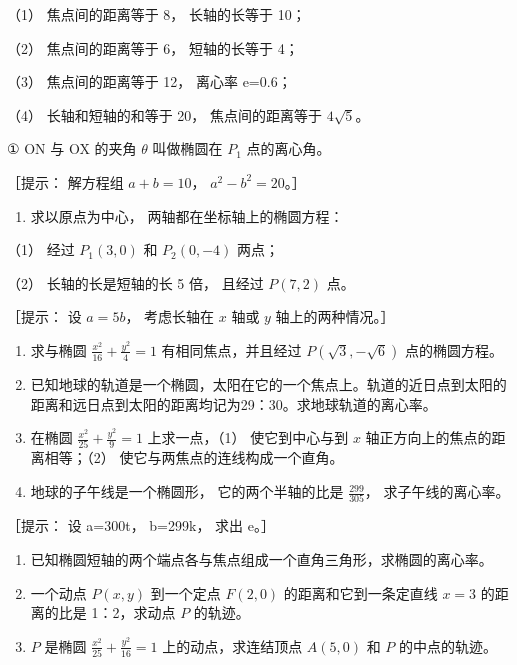（1） 焦点间的距离等于 8， 长轴的长等于 10；

（2） 焦点间的距离等于 6， 短轴的长等于 4；

（3） 焦点间的距离等于 12， 离心率 e=0.6；

（4） 长轴和短轴的和等于 20， 焦点间的距离等于 \(4 \sqrt{5}\)。

① ON 与 OX 的夹角 \(\theta\) 叫做椭圆在 \(P_{1}\) 点的离心角。

［提示： 解方程组 \(a+b=10\)， \(a^{2}-b^{2}=20\)。］

\begin{enumerate}
\def\labelenumi{\arabic{enumi}.}
\setcounter{enumi}{1}
\tightlist
\item
  求以原点为中心， 两轴都在坐标轴上的椭圆方程：
\end{enumerate}

（1） 经过 \(P_{1}(3,0)\) 和 \(P_{2}(0,-4)\) 两点；

（2） 长轴的长是短轴的长 5 倍， 且经过 \(P(7, 2)\) 点。

［提示： 设 \(a = 5b\)， 考虑长轴在 \(x\) 轴或 \(y\) 轴上的两种情况。］

\begin{enumerate}
\def\labelenumi{\arabic{enumi}.}
\setcounter{enumi}{2}
\item
  求与椭圆 \(\frac{x^2}{16} + \frac{y^2}{4} = 1\) 有相同焦点，并且经过
  \(P(\sqrt{3}, -\sqrt{6})\) 点的椭圆方程。
\item
  已知地球的轨道是一个椭圆，太阳在它的一个焦点上。轨道的近日点到太阳的距离和远日点到太阳的距离均记为29：30。求地球轨道的离心率。
\item
  在椭圆 \(\frac{x^2}{25} + \frac{y^2}{9} = 1\) 上求一点，（1）
  使它到中心与到 \(x\) 轴正方向上的焦点的距离相等；（2）
  使它与两焦点的连线构成一个直角。
\item
  地球的子午线是一个椭圆形， 它的两个半轴的比是 \(\frac{299}{305}\)，
  求子午线的离心率。
\end{enumerate}

［提示： 设 a=300t， b=299k， 求出 e。］

\begin{enumerate}
\def\labelenumi{\arabic{enumi}.}
\setcounter{enumi}{6}
\item
  已知椭圆短轴的两个端点各与焦点组成一个直角三角形，求椭圆的离心率。
\item
  一个动点 \(P(x, y)\) 到一个定点 \(F(2, 0)\) 的距离和它到一条定直线
  \(x = 3\) 的距离的比是 1：2，求动点 \(P\) 的轨迹。
\item
  \(P\) 是椭圆 \(\frac{x^2}{25} + \frac{y^2}{16} = 1\)
  上的动点，求连结顶点 \(A(5,0)\) 和 \(P\) 的中点的轨迹。
\end{enumerate}

